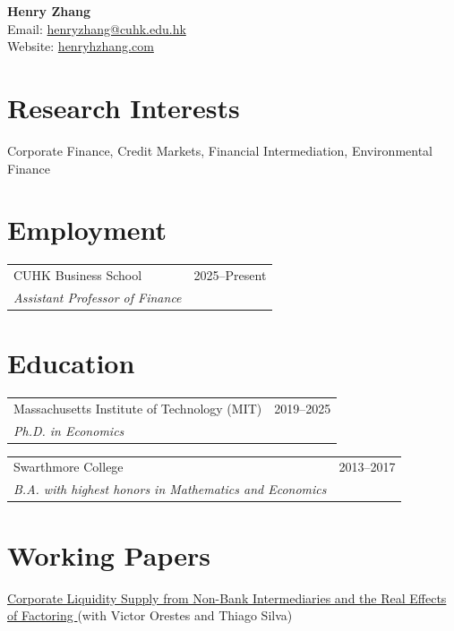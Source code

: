 \documentclass[12pt, a4paper]{article}
\makeatletter
\newcommand{\entry}[3]{%
  \noindent
  \begin{tabular*}{\textwidth}{@{\extracolsep{\fill}} p{0.8\textwidth} r}
    #1 & {\small #2} \\
    \emph{#3} &
  \end{tabular*}%
  \vspace{0.3em}
}
\makeatother
\begin{document}
{\Large \textbf{Henry Zhang}} \\[0.2cm]
Email: {\color{oxfordblue}\href{mailto:henryzhang@cuhk.edu.hk}{henryzhang@cuhk.edu.hk}} \\
Website: {\color{oxfordblue}\href{https://henryhzhang.com}{henryhzhang.com}} \\
\vspace{-1.5em}

\section*{Research Interests}
Corporate Finance, Credit Markets, Financial Intermediation, Environmental Finance

\section*{Employment}
\entry{CUHK Business School}{2025–Present}{Assistant Professor of Finance}

\vspace{-5mm}
\section*{Education}
\entry{Massachusetts Institute of Technology (MIT)}{2019–2025}{Ph.D. in Economics}
\entry{Swarthmore College}{2013–2017}{B.A. with highest honors in Mathematics and Economics}

\vspace{-5mm}
\section*{Working Papers}
{\color{oxfordblue}
\noindent \href{https://henryhzhang.com/files/Factoring.pdf}{Corporate Liquidity Supply from Non-Bank Intermediaries and the Real Effects of Factoring }
}
(with Victor Orestes and Thiago Silva) 
\end{document}
